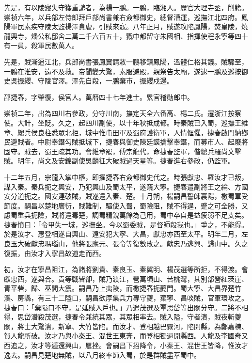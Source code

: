 \begin{pinyinscope}
先是，有以陵寢失守獲重譴者，為楊一鵬。一鵬，臨湘人。歷官大理寺丞，削籍。崇禎六年，以兵部左侍郎拜戶部尚書兼右僉都御史，總督漕運，巡撫江北四府。鳳陽軍民素疾守陵太監楊澤貪虐，引賊來寇。八年正月，賊遂攻陷鳳陽，焚皇陵，燒龍興寺，燔公私邸舍二萬二千六百五十，戮中都留守朱國相、指揮使程永寧等四十有一員，殺軍民數萬人。

先是，賊漸逼江北，兵部尚書張鳳翼請敕一鵬移鎮鳳陽，溫體仁格其議。賊驟至，一鵬在淮安，遠不及救。帝聞變大驚，素服避殿，親祭告太廟，遂逮一鵬及巡按御史吳振纓、守陵官澤。澤先自殺，一鵬棄市，振纓戍邊。

邵捷春，字肇復，侯官人。萬曆四十七年進士。累官稽勛郎中。

崇禎二年，出為四川右參政，分守川南，撫定天全六番高、楊二氏。遷浙江按察使。大計，坐貶。久之，起四川副使，以十年秋抵成都。時秦賊已入蜀，巡撫王維章、總兵侯良柱悉眾北拒，城中惟屯田軍及蜀府護衛軍，人情恇懼，捷春啟門納鄉民避賊者。中尉奉鐕勾賊抵城下，捷春與御史陳廷謨擒擊奉鐕，而募市人、起廢將固守。賊去，蜀王疏其功。會維章罷，傅宗龍代，命捷春監軍，偕總兵羅尚文擊賊。明年，尚文及安錦副使吳麟征大破賊過天星等。捷春進右參政，仍監軍。

十二年五月，宗龍入掌中樞，即擢捷春右僉都御史代之。時張獻忠、羅汝才已叛，謀入秦。秦兵扼之興安，乃犯興山及蜀太平，遂窺大寧。捷春遣副將王之綸、方國安分道扼之。國安連破賊，賊遂還入秦、楚。十月朔，楊嗣昌誓師襄陽，檄蜀軍受節度。嗣昌以楚地廣衍，賊難制，驅使入蜀，蜀險阻，賊不得逞，蹙之可全勝，又慮蜀重兵扼險，賊將還毒楚，調蜀精銳萬餘為己用，蜀中卒自是益疲弱不足支矣。捷春憤曰：「令甲失一城，巡撫坐。今以蜀委賊，是督師殺我也。」爭之，不能得。於是汝才、惠登相遂自興山、遠安犯大寧、大昌，獻忠亦西至太平。明年二月，左良玉大破獻忠瑪瑙山，他將張應元、張令等復數敗之。獻忠乃逃興、歸山中。久之復振，由汝才入寧昌故道走而西。

初，汝才在寧昌阻江，為諸將劉貴、秦良玉、秦翼明、楊茂選等所拒，不得渡。會獻忠西，遂與合。貴等戰皆卻，賊乃渡江，營萬頃山、苦桃灣，其別部營紅茨崖、青平砦，歸、巫間大震。嗣昌乃上夷陵，而檄捷春扼夔門。蜀大寧、大昌界楚竹溪、房縣，有三十二隘口，嗣昌欲厚集兵力專守夔，棄寧、昌啖賊，官軍環攻之。捷春曰：「棄隘口不守，是延賊入戶也。」乃遣茂選及覃思岱等出關分守。二將不相得，思岱潛殺茂選，捷春令兼統其眾，其眾相率去。賊入隘，守者潰，賊夜斬夔關，將士大驚潰，新寧、大竹皆陷。而汝才、登相越巴霧河，陷開縣，為鄭嘉棟、賀人龍所破。汝才乃與小秦王、混世王東奔，而登相獨過開縣西。人龍及李國奇又西追之，汝才等遁還興山，屢挫。會嗣昌下招降令，小秦王、混世王皆降，惟汝才逸去。嗣昌見楚地無賊，以八月終率師入蜀，於是群賊盡萃蜀中。


\end{pinyinscope}
